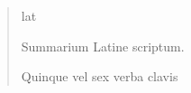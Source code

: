 \begin{abstract}
    \markboth{\abstractname}{}
\begin{scontents}[store-env=lang]
lat
\end{scontents}
\begin{scontents}[store-env=abstracts,print-env=true]
Summarium Latine scriptum.
\end{scontents}

\begin{scontents}[store-env=keywords,print-env=true]
Quinque vel sex verba clavis
\end{scontents}
\end{abstract}
\cleardoublepage
{}

